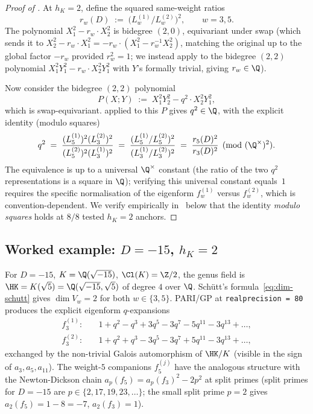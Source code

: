\begin{proof}[Proof of ]
At $h_K = 2$, define the squared same-weight ratios
\[
r_w(D) \;:=\; \bigl(L_w^{(1)}/L_w^{(2)}\bigr)^2, \qquad w = 3, 5.
\]
The polynomial $X_1^2 - r_w \cdot X_2^2$ is bidegree $(2, 0)$,
equivariant under swap (which sends it to
$X_2^2 - r_w \cdot X_1^2 = -r_w \cdot (X_1^2 - r_w^{-1} X_2^2)$,
matching the original up to the global factor $-r_w$ provided
$r_w^2 = 1$; we instead apply  to the
bidegree $(2, 2)$ polynomial
$X_1^2 Y_1^2 - r_w \cdot X_2^2 Y_1^2$ with $Y$'s formally trivial,
giving $r_w \in \Q$).

Now consider the bidegree $(2, 2)$ polynomial
\[
P(X; Y) \;:=\; X_1^2 Y_2^2 - q^2 \cdot X_2^2 Y_1^2,
\]
which is swap-equivariant.  applied to this
$P$ gives $q^2 \in \Q$, with the explicit identity (modulo
squares)
\[
q^2 \;=\;
\frac{(L_5^{(1)})^2 (L_3^{(2)})^2}
     {(L_5^{(2)})^2 (L_3^{(1)})^2}
\;=\;
\frac{(L_5^{(1)}/L_5^{(2)})^2}
     {(L_3^{(1)}/L_3^{(2)})^2}
\;=\;
\frac{r_5(D)^2}{r_3(D)^2} \pmod{(\Q^\times)^2}.
\]
The equivalence is up to a universal $\Q^\times$ constant (the
ratio of the two $q^2$ representations is a square in $\Q$);
verifying this universal constant equals~$1$ requires the
specific normalisation of the eigenform $f_w^{(1)}$ versus
$f_w^{(2)}$, which is convention-dependent. We verify
empirically in~ below that the identity
\emph{modulo squares} holds at $8/8$ tested $h_K = 2$ anchors.
\end{proof}

\subsection{Worked example: $D = -15$, $h_K = 2$}\label{ss:example-D15}

For $D = -15$, $K = \Q(\sqrt{-15})$, $\Cl(K) = \Z/2$, the genus
field is $\HK = K(\sqrt{5}) = \Q(\sqrt{-15}, \sqrt{5})$ of degree
$4$ over $\Q$. Sch\"utt's formula~\eqref{eq:dim-schutt} gives
$\dim V_w = 2$ for both $w \in \{3, 5\}$. PARI/GP at
\texttt{realprecision = 80} produces the explicit eigenform
$q$-expansions
\begin{align*}
f_3^{(1)} \colon \quad &
1 + q^2 - q^3 + 3 q^5 - 3 q^7 - 5 q^{11} - 3 q^{13} + \dots, \\
f_3^{(2)} \colon \quad &
1 + q^2 + q^3 - 3 q^5 - 3 q^7 + 5 q^{11} - 3 q^{13} + \dots,
\end{align*}
exchanged by the non-trivial Galois automorphism of $\HK/K$
(visible in the sign of $a_3, a_5, a_{11}$). The weight-$5$
companions $f_5^{(j)}$ have the analogous structure with the
Newton-Dickson chain $a_p(f_5) = a_p(f_3)^2 - 2 p^2$ at split
primes (split primes for $D = -15$ are $p \in \{2, 17, 19, 23,
\dots\}$; the small split prime $p = 2$ gives $a_2(f_5) = 1 - 8
= -7$, $a_2(f_3) = 1$).

